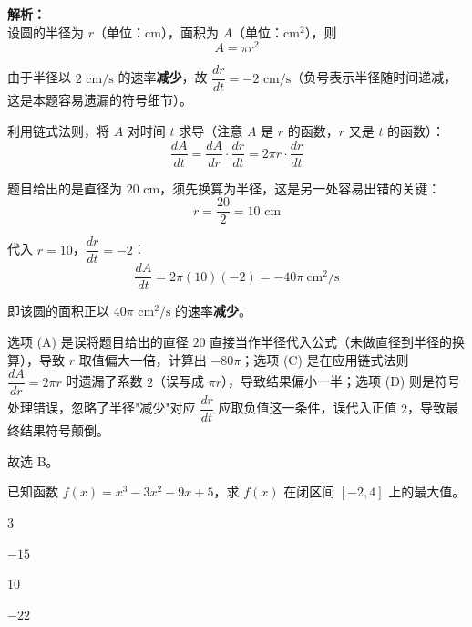 \documentclass[12pt,a4paper]{exam-zh}
\begin{document}
\begin{solution}
    \textbf{解析：} \\
    设圆的半径为 $r$（单位：cm），面积为 $A$（单位：$\text{cm}^2$），则
    \[ \displaystyle A = \pi r^2 \]

    由于半径以 $2\text{ cm/s}$ 的速率\textbf{减少}，故 $\dfrac{dr}{dt} = -2\text{ cm/s}$（负号表示半径随时间递减，这是本题容易遗漏的符号细节）。

    利用链式法则，将 $A$ 对时间 $t$ 求导（注意 $A$ 是 $r$ 的函数，$r$ 又是 $t$ 的函数）：
    \[ \displaystyle \frac{dA}{dt} = \frac{dA}{dr}\cdot\frac{dr}{dt} = 2\pi r \cdot \frac{dr}{dt} \]

    题目给出的是直径为 $20\text{ cm}$，须先换算为半径，这是另一处容易出错的关键：
    \[ \displaystyle r = \frac{20}{2} = 10 \text{ cm} \]

    代入 $r=10$，$\dfrac{dr}{dt}=-2$：
    \[ \displaystyle \frac{dA}{dt} = 2\pi(10)(-2) = -40\pi \ \text{cm}^2/\text{s} \]

    即该圆的面积正以 $40\pi\text{ cm}^2/\text{s}$ 的速率\textbf{减少}。

    选项 (A) 是误将题目给出的直径 $20$ 直接当作半径代入公式（未做直径到半径的换算），导致 $r$ 取值偏大一倍，计算出 $-80\pi$；选项 (C) 是在应用链式法则 $\dfrac{dA}{dr}=2\pi r$ 时遗漏了系数 $2$（误写成 $\pi r$），导致结果偏小一半；选项 (D) 则是符号处理错误，忽略了半径"减少"对应 $\dfrac{dr}{dt}$ 应取负值这一条件，误代入正值 $2$，导致最终结果符号颠倒。

    故选 B。
\end{solution}

\begin{question}
    已知函数 $f(x) = x^3 - 3x^2 - 9x + 5$，求 $f(x)$ 在闭区间 $[-2, 4]$ 上的最大值。\paren[C]
    \begin{choices}
        \item $3$
        \item $-15$
        \item $10$
        \item $-22$
    \end{choices}
\end{question}
\end{document}
